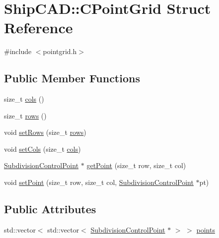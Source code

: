 \hypertarget{structShipCAD_1_1CPointGrid}{}\section{Ship\+C\+AD\+:\+:C\+Point\+Grid Struct Reference}
\label{structShipCAD_1_1CPointGrid}


{\ttfamily \#include $<$pointgrid.\+h$>$}

\subsection*{Public Member Functions}
\begin{DoxyCompactItemize}
\item 
size\+\_\+t \hyperlink{structShipCAD_1_1CPointGrid_a8d018a348a13e0f2585d1cd6b1df3e72}{cols} ()
\item 
size\+\_\+t \hyperlink{structShipCAD_1_1CPointGrid_a0ac6039ffbace01d6a89585d204393bf}{rows} ()
\item 
void \hyperlink{structShipCAD_1_1CPointGrid_a43adcefcb3e233be4f565e633382062d}{set\+Rows} (size\+\_\+t \hyperlink{structShipCAD_1_1CPointGrid_a0ac6039ffbace01d6a89585d204393bf}{rows})
\item 
void \hyperlink{structShipCAD_1_1CPointGrid_abe0f101bc5c9fb6e9ba8008cae0e1637}{set\+Cols} (size\+\_\+t \hyperlink{structShipCAD_1_1CPointGrid_a8d018a348a13e0f2585d1cd6b1df3e72}{cols})
\item 
\hyperlink{classShipCAD_1_1SubdivisionControlPoint}{Subdivision\+Control\+Point} $\ast$ \hyperlink{structShipCAD_1_1CPointGrid_a3899734154d0bbc614809a5151b1628c}{get\+Point} (size\+\_\+t row, size\+\_\+t col)
\item 
void \hyperlink{structShipCAD_1_1CPointGrid_a1d5124b9486adbe884631c3b2b61165d}{set\+Point} (size\+\_\+t row, size\+\_\+t col, \hyperlink{classShipCAD_1_1SubdivisionControlPoint}{Subdivision\+Control\+Point} $\ast$pt)
\end{DoxyCompactItemize}
\subsection*{Public Attributes}
\begin{DoxyCompactItemize}
\item 
std\+::vector$<$ std\+::vector$<$ \hyperlink{classShipCAD_1_1SubdivisionControlPoint}{Subdivision\+Control\+Point} $\ast$ $>$ $>$ \hyperlink{structShipCAD_1_1CPointGrid_a27d12df498a54a70a7d40c34def5b83c}{points}
\end{DoxyCompactItemize}


